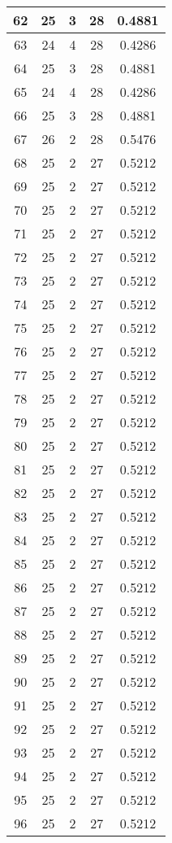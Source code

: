 \documentclass[letterpaper, 12pt]{article}
\begin{document}
\begin{longtable}{|c|c|c|c|c|}
\hline
62 & 25 & 3 & 28 & 0.4881 \\
\hline
63 & 24 & 4 & 28 & 0.4286 \\
\hline
64 & 25 & 3 & 28 & 0.4881 \\
\hline
65 & 24 & 4 & 28 & 0.4286 \\
\hline
66 & 25 & 3 & 28 & 0.4881 \\
\hline
67 & 26 & 2 & 28 & 0.5476 \\
\hline
68 & 25 & 2 & 27 & 0.5212 \\
\hline
69 & 25 & 2 & 27 & 0.5212 \\
\hline
70 & 25 & 2 & 27 & 0.5212 \\
\hline
71 & 25 & 2 & 27 & 0.5212 \\
\hline
72 & 25 & 2 & 27 & 0.5212 \\
\hline
73 & 25 & 2 & 27 & 0.5212 \\
\hline
74 & 25 & 2 & 27 & 0.5212 \\
\hline
75 & 25 & 2 & 27 & 0.5212 \\
\hline
76 & 25 & 2 & 27 & 0.5212 \\
\hline
77 & 25 & 2 & 27 & 0.5212 \\
\hline
78 & 25 & 2 & 27 & 0.5212 \\
\hline
79 & 25 & 2 & 27 & 0.5212 \\
\hline
80 & 25 & 2 & 27 & 0.5212 \\
\hline
81 & 25 & 2 & 27 & 0.5212 \\
\hline
82 & 25 & 2 & 27 & 0.5212 \\
\hline
83 & 25 & 2 & 27 & 0.5212 \\
\hline
84 & 25 & 2 & 27 & 0.5212 \\
\hline
85 & 25 & 2 & 27 & 0.5212 \\
\hline
86 & 25 & 2 & 27 & 0.5212 \\
\hline
87 & 25 & 2 & 27 & 0.5212 \\
\hline
88 & 25 & 2 & 27 & 0.5212 \\
\hline
89 & 25 & 2 & 27 & 0.5212 \\
\hline
90 & 25 & 2 & 27 & 0.5212 \\
\hline
91 & 25 & 2 & 27 & 0.5212 \\
\hline
92 & 25 & 2 & 27 & 0.5212 \\
\hline
93 & 25 & 2 & 27 & 0.5212 \\
\hline
94 & 25 & 2 & 27 & 0.5212 \\
\hline
95 & 25 & 2 & 27 & 0.5212 \\
\hline
96 & 25 & 2 & 27 & 0.5212 \\

\end{longtable}
\end{document}

